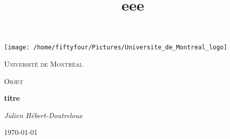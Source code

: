\documentclass[french, babel]{article}
\title{eee}
\begin{document}
\begin{titlepage}
	\centering
	\texttt{[image: /home/fiftyfour/Pictures/Universite\_de\_Montreal\_logo]}\par\vspace{1cm}
	{\scshape\LARGE Université de Montréal\par}
	\vspace{1cm}
	{\scshape\Large Objet\par}
	\vspace{1.5cm}
	{\huge\bfseries titre \par}
	\vspace{2cm}
	{\Large\itshape Julien Hébert-Doutreloux\par}
	\vfill
	\vfill
	{\large \today\par}
\end{titlepage}
\end{document}

